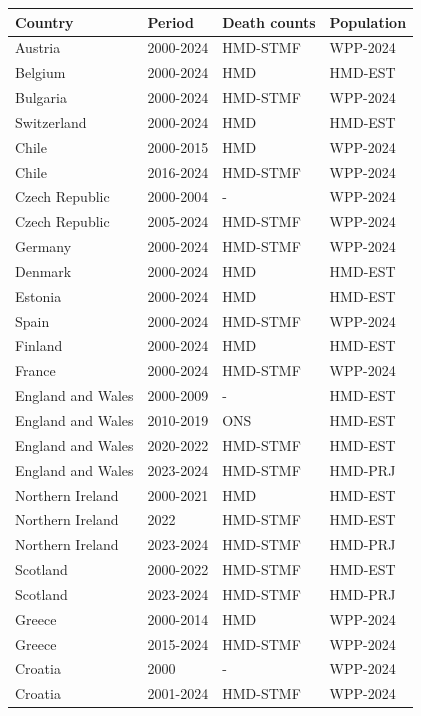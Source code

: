 \documentclass[12pt]{article}
\begin{document}
\renewcommand{\arraystretch}{0.9}
\begin{table}[ht!]
\footnotesize
\begin{tabular*}{\linewidth}{@{\extracolsep{\fill}}llll}
\toprule
Country & Period & Death counts & Population \\ 
\midrule\addlinespace[2.5pt]
Austria & 2000-2024 & HMD-STMF & WPP-2024 \\ 
Belgium & 2000-2024 & HMD & HMD-EST \\ 
Bulgaria & 2000-2024 & HMD-STMF & WPP-2024 \\ 
Switzerland & 2000-2024 & HMD & HMD-EST \\ 
Chile & 2000-2015 & HMD & WPP-2024 \\ 
Chile & 2016-2024 & HMD-STMF & WPP-2024 \\ 
Czech Republic & 2000-2004 & - & WPP-2024 \\ 
Czech Republic & 2005-2024 & HMD-STMF & WPP-2024 \\ 
Germany & 2000-2024 & HMD-STMF & WPP-2024 \\ 
Denmark & 2000-2024 & HMD & HMD-EST \\ 
Estonia & 2000-2024 & HMD & HMD-EST \\ 
Spain & 2000-2024 & HMD-STMF & WPP-2024 \\ 
Finland & 2000-2024 & HMD & HMD-EST \\ 
France & 2000-2024 & HMD-STMF & WPP-2024 \\ 
England and Wales & 2000-2009 & - & HMD-EST \\ 
England and Wales & 2010-2019 & ONS & HMD-EST \\ 
England and Wales & 2020-2022 & HMD-STMF & HMD-EST \\ 
England and Wales & 2023-2024 & HMD-STMF & HMD-PRJ \\ 
Northern Ireland & 2000-2021 & HMD & HMD-EST \\ 
Northern Ireland & 2022 & HMD-STMF & HMD-EST \\ 
Northern Ireland & 2023-2024 & HMD-STMF & HMD-PRJ \\ 
Scotland & 2000-2022 & HMD-STMF & HMD-EST \\ 
Scotland & 2023-2024 & HMD-STMF & HMD-PRJ \\ 
Greece & 2000-2014 & HMD & WPP-2024 \\ 
Greece & 2015-2024 & HMD-STMF & WPP-2024 \\ 
Croatia & 2000 & - & WPP-2024 \\ 
Croatia & 2001-2024 & HMD-STMF & WPP-2024 \\ 

\end{tabular*}
\end{table}
\end{document}
